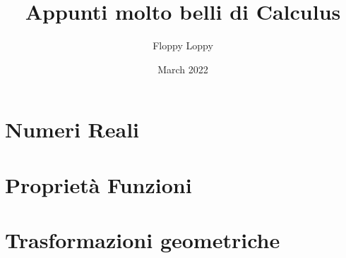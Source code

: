 \documentclass[a4paper]{article}
\theoremstyle{definition}
\begin{document}
\title{Appunti molto belli di Calculus}
\author{Floppy Loppy}
\date{March 2022}
\maketitle
\tableofcontents




\newpage
\section{Numeri Reali}\label{sec:introduzione}



\newpage
\section{Proprietà Funzioni}\label{sec:proprietà_funzioni}


\newpage
\section{Trasformazioni geometriche}\label{sec:trasformazioni_gemoetriche}

\end{document}
